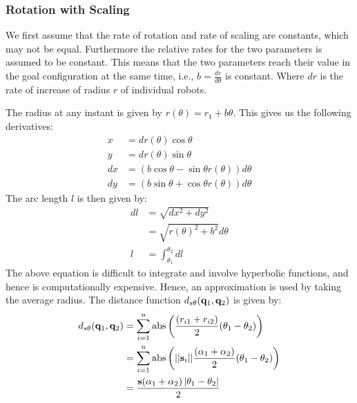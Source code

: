 \documentclass[12pt,a4paper, onecolumn]{IEEEtran}
\begin{document}
\subsubsection{Rotation with Scaling}
We first assume that the rate of rotation and rate of scaling are constants, which may not
be equal. Furthermore the relative rates for the two parameters is assumed to be constant.
This means that the two parameters reach their value in the goal configuration at the same
time, i.e., $b = \frac{dr}{d\theta}$ is constant. Where $dr$ is the rate of increase of radius
$r$ of individual robots.

The radius at any instant is given by $r(\theta) = r_1 + b \theta$. This gives us the
following derivatives:
\begin{equation}
  \begin{split}
    x &= dr(\theta)\cos\theta\\
    y &= dr(\theta)\sin\theta\\
    dx & = (b\cos\theta - \sin \theta r(\theta))d\theta\\
    dy & = (b\sin\theta + \cos \theta r(\theta))d\theta
  \end{split}
  \label{eqn:dstht}
\end{equation}
The arc length $l$ is then given by:
\begin{equation}
  \begin{split}
    dl&=\sqrt{dx^2+dy^2}\\
    &=\sqrt{r(\theta)^2 + b^2}d\theta\\
    l&= \int_{\theta_1}^{\theta_2} dl
  \end{split}
  \label{eqn:arc}
\end{equation}
The above equation is difficult to integrate and involve hyperbolic functions, and hence
is computationally expensive. Hence, an approximation is used by taking the average
radius. The distance function $d_{s\theta}(\mathbf{q}_1, \mathbf{q}_2)$ is given by:
\begin{equation}
  \begin{split}
    d_{s\theta}(\mathbf{q}_1, \mathbf{q}_2) &= \sum_{i=1}^n\operatorname{abs} \left(\frac{(r_{i1} +
      r_{i2})}{2}(\theta_1 -
    \theta_2)\right ) \\
    &=\sum_{i=1}^n \operatorname{abs}\left( ||\mathbf{s}_i|| \frac{(\alpha_1
    +\alpha_2)}{2}(\theta_1-\theta_2) \right)\\
    &=\frac{\mathbf{s}  (\alpha_1 +\alpha_2)\left |\theta_1-\theta_2 \right|}{2}
  \end{split}
  \label{eqn:dsthta}
\end{equation}
\end{document}
